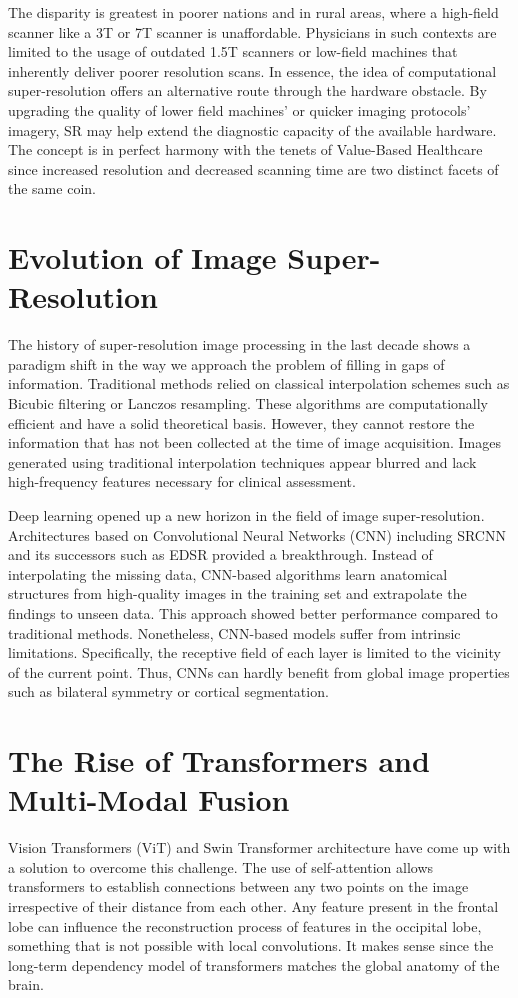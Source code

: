 The disparity is greatest in poorer nations and in rural areas, where a high-field scanner like a 3T or 7T scanner is unaffordable. Physicians in such contexts are limited to the usage of outdated 1.5T scanners or low-field machines that inherently deliver poorer resolution scans. In essence, the idea of computational super-resolution offers an alternative route through the hardware obstacle. By upgrading the quality of lower field machines' or quicker imaging protocols' imagery, SR may help extend the diagnostic capacity of the available hardware. The concept is in perfect harmony with the tenets of Value-Based Healthcare since increased resolution and decreased scanning time are two distinct facets of the same coin.

\section{Evolution of Image Super-Resolution}
The history of super-resolution image processing in the last decade shows a paradigm shift in the way we approach the problem of filling in gaps of information. Traditional methods relied on classical interpolation schemes such as Bicubic filtering or Lanczos resampling. These algorithms are computationally efficient and have a solid theoretical basis. However, they cannot restore the information that has not been collected at the time of image acquisition. Images generated using traditional interpolation techniques appear blurred and lack high-frequency features necessary for clinical assessment.

Deep learning opened up a new horizon in the field of image super-resolution. Architectures based on Convolutional Neural Networks (CNN) including SRCNN and its successors such as EDSR provided a breakthrough. Instead of interpolating the missing data, CNN-based algorithms learn anatomical structures from high-quality images in the training set and extrapolate the findings to unseen data. This approach showed better performance compared to traditional methods. Nonetheless, CNN-based models suffer from intrinsic limitations. Specifically, the receptive field of each layer is limited to the vicinity of the current point. Thus, CNNs can hardly benefit from global image properties such as bilateral symmetry or cortical segmentation.

\section{The Rise of Transformers and Multi-Modal Fusion}
Vision Transformers (ViT) and Swin Transformer architecture have come up with a solution to overcome this challenge. The use of self-attention allows transformers to establish connections between any two points on the image irrespective of their distance from each other. Any feature present in the frontal lobe can influence the reconstruction process of features in the occipital lobe, something that is not possible with local convolutions. It makes sense since the long-term dependency model of transformers matches the global anatomy of the brain.

